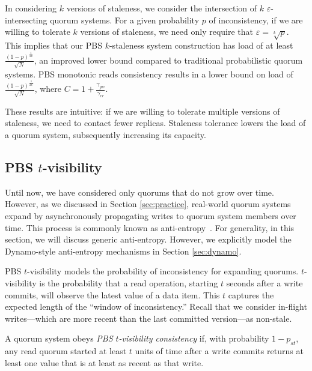 \documentclass{vldb}
\newcommand{\subsectionskip}{-0em}
\begin{document}
In considering $k$ versions of staleness, we consider the intersection
of $k$ $\varepsilon$-intersecting quorum systems.  For a given
probability $p$ of inconsistency, if we are willing to tolerate $k$
versions of staleness, we need only require that $\varepsilon =
\sqrt[k]{p}$.  This implies that our PBS $k$-staleness system
construction has load of at least
$\frac{(1-p)^{\frac{1}{2k}}}{\sqrt{N}}$, an improved lower bound
compared to traditional probabilistic quorum systems.  PBS monotonic
reads consistency results in a lower bound on load of
$\frac{(1-p)^{\frac{1}{2C}}}{\sqrt{N}}$, where
$C=1+\frac{\gamma_{gw}}{\gamma_{cr}}$.

These results are intuitive: if we are willing to tolerate multiple
versions of staleness, we need to contact fewer replicas.  Staleness
tolerance lowers the load of a quorum system, subsequently increasing
its capacity.

\vspace{\subsectionskip}\subsection{PBS $t$-visibility}
\label{sec:tvis}

Until now, we have considered only quorums that do not grow over time.
However, as we discussed in Section \ref{sec:practice}, real-world
quorum systems expand by asynchronously propagating writes to quorum
system members over time.  This process is commonly known as
anti-entropy~\cite{antientropy}.  For generality, in this section, we
will discuss generic anti-entropy. However, we explicitly model the
Dynamo-style anti-entropy mechanisms in Section \ref{sec:dynamo}.

PBS $t$-visibility models the probability of inconsistency for
expanding quorums.  $t$-visibility is the probability that a read
operation, starting $t$ seconds after a write commits, will observe
the latest value of a data item. This $t$ captures the expected length
of the ``window of inconsistency.''  Recall that we consider in-flight
writes---which are more recent than the last committed version---as
non-stale.

\begin{definition}
A quorum system obeys \textit{PBS $t$-visibility consistency} if, with
probability $1-p_{st}$, any read quorum started at least $t$ units
of time after a write commits returns at least one value
that is at least as recent as that write.
\end{definition}
\end{document}
